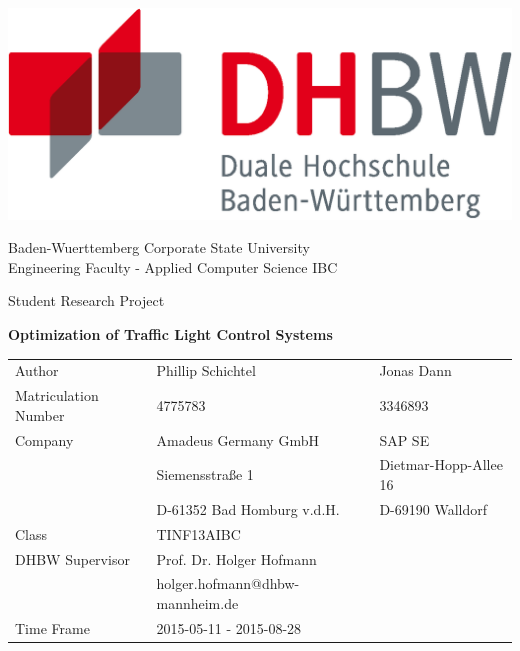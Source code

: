 \thispagestyle{empty}

\includegraphics[scale=0.3]{resources/dhbw_logo.eps} \\

\begin{center}

\vspace{0.5cm}

{\large Baden-Wuerttemberg Corporate State University}\\
{\large Engineering Faculty - Applied Computer Science IBC}\\

\vspace{0.5cm}

{\large Student Research Project}\\

\vspace{1cm}

{\large \textbf{Optimization of Traffic Light Control Systems}}

\vspace{1.5cm}

\begin{tabular}{lll}
Author				& Phillip Schichtel & Jonas Dann \\
Matriculation Number& 4775783 & 3346893 \\
Company				& Amadeus Germany GmbH & SAP SE \\
					& Siemensstraße 1 & Dietmar-Hopp-Allee 16 \\
					& D-61352 Bad Homburg v.d.H. & D-69190 Walldorf \\
Class				& TINF13AIBC & \\
DHBW Supervisor	    & Prof. Dr. Holger Hofmann & \\
					& holger.hofmann@dhbw-mannheim.de & \\
Time Frame			& 2015-05-11 - 2015-08-28\\
\end{tabular}

\vspace{0.5cm}
\vspace{0.5cm}

\end{center}

\newpage